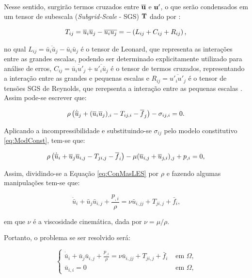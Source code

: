 \documentclass[_ArquivoPrincipal.tex]{subfiles}
\begin{document}
Nesse sentido, surgirão termos cruzados entre $\overline{\mathbf{u}}$ e $\mathbf{u}'$, o que serão condensados em um tensor de subescala (\textit{Subgrid-Scale} - SGS) $\mathbf{T}$ dado por \cite{piomelli1999large,hughes2000large}:

\begin{equation}
    T_{ij}=\overline{u}_i\overline{u}_j-\overline{u_iu_j}=-\left({L_{ij}+C_{ij}+R_{ij}}\right)\text{,}
\end{equation}

\noindent no qual $L_{ij}=\overline{\bar{u}_i\bar{u}_j}-\bar{u}_i\bar{u}_j$ é o tensor de Leonard, que representa as interações entre as grandes escalas, podendo ser determinado explicitamente utilizado para análise de erros, $C_{ij}=\overline{\bar{u}_iu'_j}+\overline{u'_i\bar{u}_j}$ é o tensor de termos cruzados, representando a interação entre as grandes e pequenas escalas e $R_{ij}=\overline{u'_iu'_j}$ é o tensor de tensões SGS de Reynolds, que rerepsenta a interação entre as pequenas escalas \cite{piomelli1999large}. Assim pode-se escrever que:

\begin{equation}
    \rho\left({\dot{\overline{u}}_j+(\overline{u}_i\overline{u}_j)_{,i}-T_{ij,i}-\overline{f}_j}\right)-\sigma_{ij,i}=0\text{.}
\end{equation}

Aplicando a incompressibilidade e substituindo-se $\sigma_{ij}$ pelo modelo constitutivo \ref{eq:ModConst}, tem-se que:

\begin{equation}
    \rho\left({\dot{\overline{u}}_i+\overline{u}_j\overline{u}_{i,j}-T_{ji,j}-\overline{f}_i}\right)-\mu(\overline{u}_{i,j}+\overline{u}_{j,i})_{,j}+p_{,i}=0\text{,}\label{eq:ConMasLES}
\end{equation}

\noindent Assim, dividindo-se a Equação \ref{eq:ConMasLES} por $\rho$ e fazendo algumas manipulações tem-se que:

\begin{equation}
    \dot{\bar{u}}_i+\bar{u}_j\bar{u}_{i,j}+\frac{p_{,i}}{\rho}=\nu\bar{u}_{i,jj}+T_{ji,j}+\bar{f}_i\text{,}
\end{equation}

\noindent em que $\nu$ é a viscosidade cinemática, dada por $\nu=\mu/\rho$.

Portanto, o problema se ser resolvido será:

\begin{equation}
    \left\{
    \begin{array}{ll}
        \dot{\bar{u}}_i+\bar{u}_j\bar{u}_{i,j}+\frac{p_{,i}}{\rho}=\nu\bar{u}_{i,jj}+T_{ji,j}+\bar{f}_i & \text{ em }\Omega\text{,} \\
        \bar{u}_{i,i}=0                                                                                 & \text{ em }\Omega\text{,}
    \end{array}
    \right.
\end{equation}
\end{document}
